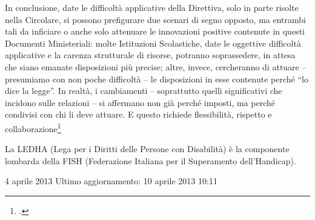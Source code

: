 In conclusione, date le difficoltà applicative della Direttiva, solo in parte risolte nella Circolare, si possono prefigurare due scenari di segno opposto, ma entrambi tali da inficiare o anche solo attenuare le innovazioni positive contenute in questi Documenti Ministeriali: molte Istituzioni Scolastiche, date le oggettive difficoltà applicative e la carenza strutturale di risorse, potranno soprassedere, in attesa che siano emanate disposizioni più precise; altre, invece, cercheranno di attuare – presumiamo con non poche difficoltà – le disposizioni in esse contenute perché “lo dice la legge”.
In realtà, i cambiamenti – soprattutto quelli significativi che incidono sulle relazioni – si affermano non già perché imposti, ma perché condivisi con chi li deve attuare. E questo richiede flessibilità, rispetto e collaborazione\footcite{GruppoLEDHA2013}


La LEDHA (Lega per i Diritti delle Persone con Disabilità) è la componente lombarda della FISH (Federazione Italiana per il Superamento dell’Handicap).

4 aprile 2013
Ultimo aggiornamento: 10 aprile 2013 10:11